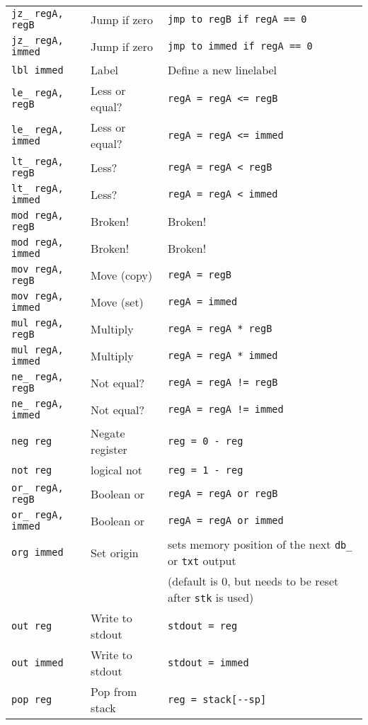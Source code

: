 \documentclass{article}
\begin{document}
\begin{table}[h]
\begin{longtable}{lll}
\verb|jz_ regA, regB| & Jump if zero & \verb|jmp to regB if regA == 0|      \\
\verb|jz_ regA, immed| & Jump if zero & \verb|jmp to immed if regA == 0|      \\
\verb|lbl immed| & Label & Define a new linelabel     \\
\verb|le_ regA, regB| & Less or equal? & \verb|regA = regA <= regB|     \\
\verb|le_ regA, immed| & Less or equal? & \verb|regA = regA <= immed|     \\
\verb|lt_ regA, regB| & Less? & \verb|regA = regA < regB|     \\
\verb|lt_ regA, immed| & Less? & \verb|regA = regA < immed|     \\
\verb|mod regA, regB| & Broken! & Broken!     \\
\verb|mod regA, immed| & Broken! & Broken!     \\
\verb|mov regA, regB| & Move (copy) & \verb|regA = regB|      \\
\verb|mov regA, immed| & Move (set) & \verb|regA = immed|     \\
\verb|mul regA, regB| & Multiply & \verb|regA = regA * regB|      \\
\verb|mul regA, immed| & Multiply & \verb|regA = regA * immed|      \\
\verb|ne_ regA, regB| & Not equal? & \verb|regA = regA != regB|     \\
\verb|ne_ regA, immed| & Not equal? & \verb|regA = regA != immed|     \\
\verb|neg reg| & Negate register & \verb|reg = 0 - reg|     \\
\verb|not reg| & logical not & \verb|reg = 1 - reg|     \\
\verb|or_ regA, regB| & Boolean or & \verb|regA = regA or regB|      \\
\verb|or_ regA, immed| & Boolean or & \verb|regA = regA or immed|     \\
\verb|org immed| & Set origin & sets memory position of the next \verb|db_| or \verb|txt| output \\
 & & (default is 0, but needs to be reset after \verb|stk| is used)       \\
\verb|out reg| & Write to stdout & \verb|stdout = reg|     \\
\verb|out immed| & Write to stdout & \verb|stdout = immed|     \\
\verb|pop reg| & Pop from stack & \verb|reg = stack[--sp]|     \\

\end{longtable}
\end{table}
\end{document}

